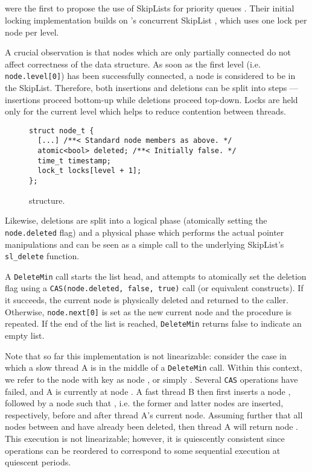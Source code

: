 \documentclass[a4paper,10pt]{article}
\begin{document}
\subsection{\citeauthor{shavit2000skiplist}} \label{sec:shavit}

\citeauthor{shavit2000skiplist} were the first to propose the use of SkipLists
for priority queues \cite{linden2013skiplist}. Their initial locking implementation
\cite{shavit2000skiplist} builds on \citeauthor{pugh1998concurrent}'s concurrent
SkipList \cite{pugh1998concurrent}, which uses one lock per node per level.

A crucial observation is that nodes which are only partially connected
do not affect correctness of the data structure. As soon as the first level (i.e. \lstinline|node.level[0]|)
has been successfully connected, a node is considered to be in the SkipList.
Therefore, both insertions and deletions can be split into steps --- insertions
proceed bottom-up while deletions proceed top-down. Locks are held only for the current level
which helps to reduce contention between threads.

\begin{figure}[ht]
\begin{lstlisting}
struct node_t {
  [...] /**< Standard node members as above. */
  atomic<bool> deleted; /**< Initially false. */
  time_t timestamp;
  lock_t locks[level + 1];
};
\end{lstlisting}
\caption{\citeauthor{shavit2000skiplist} structure.}
\label{fig:shavitsl}
\end{figure}

Likewise, deletions are split into a logical phase (atomically setting the \lstinline|node.deleted|
flag) and a physical phase which performs the actual pointer manipulations and can be seen as a simple
call to the underlying SkipList's \lstinline|sl_delete| function.

A \lstinline|DeleteMin| call starts the list head, and attempts to atomically set
the deletion flag using a \lstinline|CAS(node.deleted, false, true)| call (or equivalent constructs).
If it succeeds, the current node is physically deleted and returned to the caller. Otherwise,
\lstinline|node.next[0]| is set as the new current node and the procedure is repeated.
If the end of the list is reached, \lstinline|DeleteMin| returns false to indicate an empty list.



Note that so far this implementation is not linearizable: consider the case in which a
slow thread A is in the middle of a \lstinline|DeleteMin| call. Within this context, we refer to
the node with key  as node , or simply . Several \lstinline|CAS|
operations have failed, and A is currently at node .
A fast thread B then first inserts a node , followed by a node  such that
, i.e. the former and latter nodes are inserted, respectively, before and after
thread A's current node. Assuming further that all nodes between  and  have already
been deleted, then thread A will return node . This execution is not linearizable; however,
it is quiescently consistent since operations can be reordered to correspond to some sequential
execution at quiescent periods.
\end{document}
